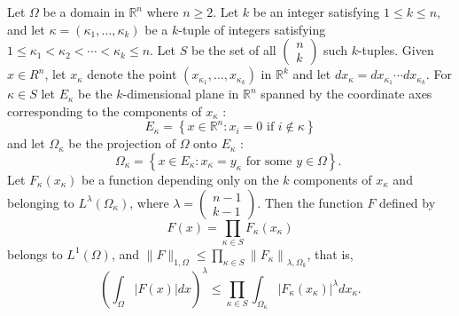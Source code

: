 \begin{lemma}
  Let $\Omega$ be a domain in $\mathbb{R}^n$ where $n \geq 2$. Let $k$ be an integer satisfying $1 \leq k \leq n$, and let $\kappa=\left(\kappa_1, \ldots, \kappa_k\right)$ be a $k$-tuple of integers satisfying $1 \leq \kappa_1<\kappa_2<\cdots<\kappa_k \leq n$. Let $S$ be the set of all $\left(\begin{array}{l}n \\ k\end{array}\right)$ such $k$-tuples. Given $x \in R^n$, let $x_\kappa$ denote the point $\left(x_{\kappa_1}, \ldots, x_{\kappa_k}\right)$ in $\mathbb{R}^k$ and let $d x_\kappa=d x_{\kappa_1} \cdots d x_{\kappa_k}$.
  For $\kappa \in S$ let $E_\kappa$ be the $k$-dimensional plane in $\mathbb{R}^n$ spanned by the coordinate axes corresponding to the components of $x_\kappa$ :
  \[
  E_\kappa=\left\{x \in \mathbb{R}^n: x_i=0 \text { if } i \notin \kappa\right\}
  \]
  and let $\Omega_\kappa$ be the projection of $\Omega$ onto $E_\kappa$ :
  \[
  \Omega_\kappa=\left\{x \in E_\kappa: x_\kappa=y_\kappa \text { for some } y \in \Omega\right\} \text {. }
  \]
  Let $F_\kappa\left(x_\kappa\right)$ be a function depending only on the $k$ components of $x_\kappa$ and belonging to $L^\lambda\left(\Omega_\kappa\right)$, where $\lambda=\left(\begin{array}{l}n-1 \\ k-1\end{array}\right)$. Then the function $F$ defined by
  \[
  F(x)=\prod_{\kappa \in S} F_\kappa\left(x_\kappa\right)
  \]
  belongs to $L^1(\Omega)$, and $\|F\|_{1, \Omega} \leq \prod_{\kappa \in S}\left\|F_\kappa\right\|_{\lambda, \Omega_k}$, that is,
  \[
  \left(\int_{\Omega}|F(x)| d x\right)^\lambda \leq \prod_{\kappa \in S} \int_{\Omega_\kappa}\left|F_\kappa\left(x_\kappa\right)\right|^\lambda d x_\kappa .
  \]
\end{lemma}


